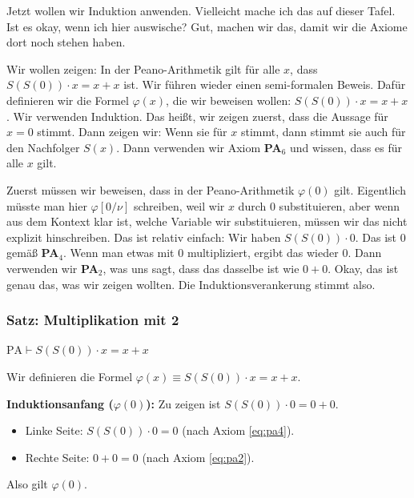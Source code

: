 \begin{spoken-clean}[00:24:50 - 00:28:30]
Jetzt wollen wir Induktion anwenden. Vielleicht mache ich das auf dieser Tafel. Ist es okay, wenn ich hier auswische?  Gut, machen wir das, damit wir die Axiome dort noch stehen haben. 

Wir wollen zeigen: In der Peano-Arithmetik gilt für alle $x$, dass $S(S(0)) \cdot x = x + x$ ist. Wir führen wieder einen semi-formalen Beweis. Dafür definieren wir die Formel $\varphi(x)$, die wir beweisen wollen: $S(S(0)) \cdot x = x + x$. Wir verwenden Induktion. Das heißt, wir zeigen zuerst, dass die Aussage für $x = 0$ stimmt. Dann zeigen wir: Wenn sie für $x$ stimmt, dann stimmt sie auch für den Nachfolger $S(x)$. Dann verwenden wir Axiom \textbf{PA$_6$} und wissen, dass es für alle $x$ gilt.

Zuerst müssen wir beweisen, dass in der Peano-Arithmetik $\varphi(0)$ gilt. Eigentlich müsste man hier $\varphi[0/\nu]$ schreiben, weil wir $x$ durch $0$ substituieren, aber wenn aus dem Kontext klar ist, welche Variable wir substituieren, müssen wir das nicht explizit hinschreiben. Das ist relativ einfach: Wir haben $S(S(0)) \cdot 0$. Das ist $0$ gemäß \textbf{PA$_4$}. Wenn man etwas mit $0$ multipliziert, ergibt das wieder $0$. Dann verwenden wir \textbf{PA$_2$}, was uns sagt, dass das dasselbe ist wie $0 + 0$. Okay, das ist genau das, was wir zeigen wollten. Die Induktionsverankerung stimmt also.
\end{spoken-clean}

\subsubsection{Satz: Multiplikation mit 2}
\begin{math-stroke}
\begin{proposition}
    \label{prop:2x_is_xx}
    $\text{PA} \vdash S(S(0)) \cdot x = x + x$
\end{proposition}

\begin{short-proof}
Wir definieren die Formel $\varphi(x) \equiv S(S(0)) \cdot x = x + x$.

\textbf{Induktionsanfang ($\varphi(0)$):}
Zu zeigen ist $S(S(0)) \cdot 0 = 0 + 0$.
\begin{itemize}
    \item Linke Seite: $S(S(0)) \cdot 0 = 0$ (nach Axiom \ref{eq:pa4}).
    \item Rechte Seite: $0 + 0 = 0$ (nach Axiom \ref{eq:pa2}).
\end{itemize}
Also gilt $\varphi(0)$.
\end{short-proof}
\end{math-stroke}

